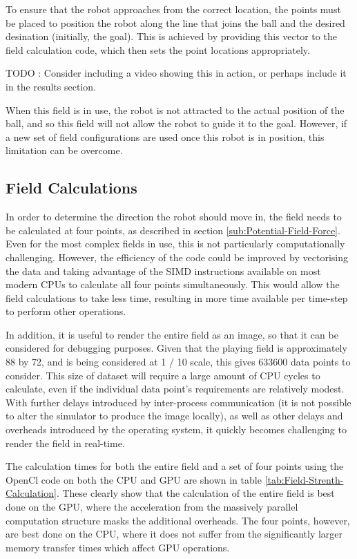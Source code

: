 \documentclass[10pt]{article} \usepackage[a4paper]{geometry}
\begin{document}
To ensure that the robot approaches from the correct location, the points must
be placed to position the robot along the line that joins the ball and the
desired desination (initially, the goal).  This is achieved by providing this
vector to the field calculation code, which then sets the point locations
appropriately.

TODO : Consider including a video showing this in action, or perhaps include it
in the results section.

When this field is in use, the robot is not attracted to the actual position of
the ball, and so this field will not allow the robot to guide it to the goal.
However, if a new set of field configurations are used once this robot is in
position, this limitation can be overcome.

\subsection{Field Calculations}

In order to determine the direction the robot should move in, the field needs to
be calculated at four points, as described in section
\ref{sub:Potential-Field-Force}. Even for the most complex fields in use, this
is not particularly computationally challenging. However, the efficiency of the
code could be improved by vectorising the data and taking advantage of the
\ac{SIMD} instructions available on most modern \acp{CPU} to calculate all four
points simultaneously. This would allow the field calculations to take less
time, resulting in more time available per time-step to perform other
operations.

In addition, it is useful to render the entire field as an image, so that it can
be considered for debugging purposes. Given that the playing field is
approximately \SI{88}{\inch} by \SI{72}{\inch}, and is being considered at
\SI[quotient-mode = fraction]{1 / 10}{\inch} scale, this gives \num{633600} data
points to consider. This size of dataset will require a large amount of \ac{CPU}
cycles to calculate, even if the individual data point's requirements are
relatively modest. With further delays introduced by inter-process communication
(it is not possible to alter the simulator to produce the image locally), as
well as other delays and overheads introduced by the operating system, it
quickly becomes challenging to render the field in real-time.

The calculation times for both the entire field and a set of four points using
the OpenCl code on both the \ac{CPU} and \ac{GPU} are shown in table
\ref{tab:Field-Strenth-Calculation}. These clearly show that the calculation of
the entire field is best done on the GPU, where the acceleration from the
massively parallel computation structure masks the additional overheads. The
four points, however, are best done on the \ac{CPU}, where it does not suffer
from the significantly larger memory transfer times which affect \ac{GPU}
operations.
\end{document}
